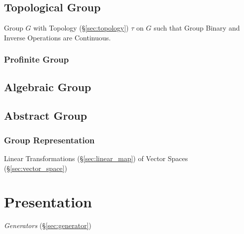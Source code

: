 \subsection{Topological Group}\label{sec:topological_group}

Group $G$ with Topology (\S\ref{sec:topology}) $\tau$ on $G$ such that
Group Binary and Inverse Operations are Continuous.



\subsubsection{Profinite Group}\label{sec:profinite_group}



\subsection{Algebraic Group}\label{sec:algebraic_group}

\subsection{Abstract Group}\label{sec:abstract_group}

\subsubsection{Group Representation}\label{sec:group_representation}

Linear Transformations (\S\ref{sec:linear_map}) of Vector Spaces
(\S\ref{sec:vector_space})



\section{Presentation}\label{sec:presentation}

\emph{Generators} (\S\ref{sec:generator})

